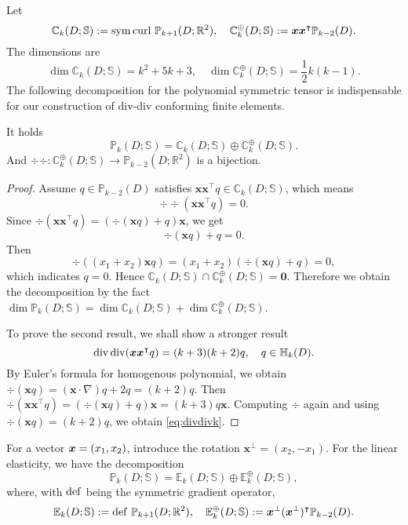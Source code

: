 %
Let
\[
\mathbb C_k(D; \mathbb S):=\operatorname{sym}\operatorname{curl} \, \mathbb P_{k+1}(D;\mathbb R^2),\quad \mathbb C_k^{\oplus}(D; \mathbb S):=\boldsymbol  x\boldsymbol  x^{\intercal}\mathbb P_{k-2}(D).
\]
The dimensions are
\[
\dim\mathbb C_k(D; \mathbb S)=k^2+5k+3,\quad \dim\mathbb C_k^{\oplus}(D; \mathbb S)=\frac{1}{2}k(k-1).
\]
The following decomposition for the polynomial symmetric tensor is indispensable for our construction of div-div conforming finite elements.  
\begin{lemma}\label{lem:symmpolyspacedirectsum}
It holds
\[
\mathbb P_{k}(D;\mathbb S)=\mathbb C_k(D;\mathbb S)\oplus \mathbb C_k^{\oplus}(D;\mathbb S).
\]
And $\div\div: \mathbb C_k^{\oplus}(D;\mathbb S)\to\mathbb P_{k-2}(D;\mathbb R^2)$ is a bijection.
\end{lemma}
\begin{proof}
Assume $q\in\mathbb P_{k-2}(D)$ satisfies $\boldsymbol x\boldsymbol  x^{\intercal}q\in\mathbb C_k(D;\mathbb S)$, which means
\[
\div{\div}(\boldsymbol x\boldsymbol  x^{\intercal}q)=0.
\]
Since
$
{\div}(\boldsymbol x\boldsymbol x^{\intercal}q)=(\div(\boldsymbol  x q)+q)\boldsymbol  x
$,  we get
\[
\div(\boldsymbol  x q)+q=0.
\]
Then
\[
\div((x_1+x_2)\boldsymbol  x q)=(x_1+x_2)(\div(\boldsymbol  x q)+q)=0,
\]
which indicates $q=0$.
Hence $\mathbb C_k(D;\mathbb S)\cap\mathbb C_k^{\oplus}(D;\mathbb S)=\boldsymbol 0$.
Therefore we obtain the decomposition by the fact $\dim\mathbb P_{k}(D;\mathbb S)=\dim\mathbb C_k(D;\mathbb S)+\dim\mathbb C_k^{\oplus}(D;\mathbb S)$.

To prove the second result, we shall show a stronger result 
\begin{equation}\label{eq:divdivk}
\operatorname{div}\operatorname{div} (\boldsymbol x\boldsymbol x^{\intercal} q) = (k+3)(k+2) q, \quad q\in \mathbb H_k(D).
\end{equation}
By Euler's formula for homogenous polynomial, we obtain $\div(\boldsymbol  x q)=(\boldsymbol x\cdot\nabla)q+2q = (k+2)q$. Then $
{\div}(\boldsymbol  x\boldsymbol  x^{\intercal}q)=(\div(\boldsymbol x q)+q)\boldsymbol  x = (k+3)q \boldsymbol x.
$
Computing $\div$ again and using $\div(\boldsymbol  x q)=(k+2)q$, we obtain \eqref{eq:divdivk}. 
\end{proof}

\begin{remark}\label{rm:Ek}
For a vector $\boldsymbol x = (x_1, x_2)$, introduce the rotation $\boldsymbol x^{\perp}= (x_2, -x_1)$. For the linear elasticity, we have the decomposition
\[
\mathbb P_{k}(D;\mathbb S)=\mathbb E_k(D;\mathbb S)\oplus \mathbb E_k^{\oplus}(D;\mathbb S),
\]
where, with $\operatorname{def}$ being the symmetric gradient operator,
\[
\mathbb E_k(D;\mathbb S):=\operatorname{def}\,\mathbb P_{k+1}(D;\mathbb R^2),\quad \mathbb E_k^{\oplus}(D;\mathbb S):=\boldsymbol  x^{\perp}(\boldsymbol  x^{\perp})^{\intercal}\mathbb P_{k-2}(D).
\]
\end{remark}

